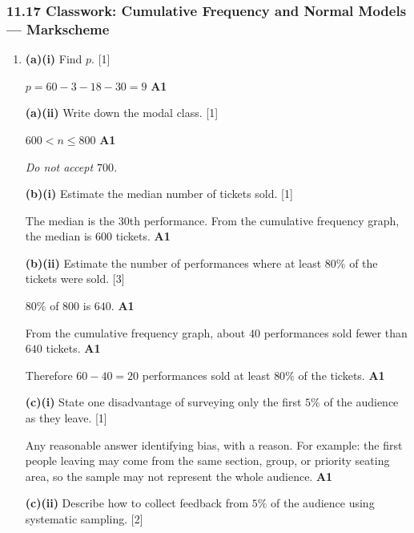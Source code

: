 \documentclass[12pt, twoside]{article}
\begin{document}
\subsubsection*{11.17 Classwork: Cumulative Frequency and Normal Models --- Markscheme}

\begin{enumerate}[itemsep=0.3cm]

\item[1.] 

\textbf{(a)(i)} Find $p$. \hfill [1]

$p=60-3-18-30=9$ \hfill \textbf{A1}

\medskip

\textbf{(a)(ii)} Write down the modal class. \hfill [1]

$600<n\leq 800$ \hfill \textbf{A1}

\emph{Do not accept $700$.}

\medskip

\textbf{(b)(i)} Estimate the median number of tickets sold. \hfill [1]

The median is the 30th performance. From the cumulative frequency graph,
the median is $600$ tickets. \hfill \textbf{A1}

\medskip

\textbf{(b)(ii)} Estimate the number of performances where at least
$80\%$ of the tickets were sold. \hfill [3]

$80\%$ of $800$ is $640$. \hfill \textbf{A1}

From the cumulative frequency graph, about $40$ performances sold fewer
than $640$ tickets. \hfill \textbf{A1}

Therefore $60-40=20$ performances sold at least $80\%$ of the tickets.
\hfill \textbf{A1}

\medskip

\textbf{(c)(i)} State one disadvantage of surveying only the first
$5\%$ of the audience as they leave. \hfill [1]

Any reasonable answer identifying bias, with a reason. For example:
the first people leaving may come from the same section, group, or
priority seating area, so the sample may not represent the whole
audience. \hfill \textbf{A1}

\medskip

\textbf{(c)(ii)} Describe how to collect feedback from $5\%$ of the
audience using systematic sampling. \hfill [2]


\end{enumerate}
\end{document}
